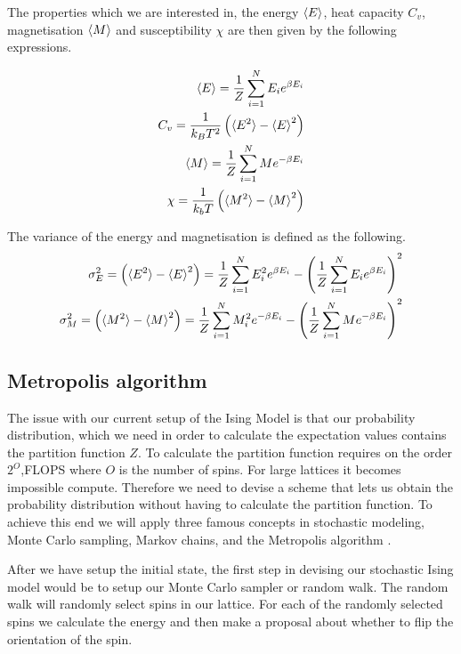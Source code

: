 The properties which we are interested in, the energy $\braket{E}$, heat
capacity $C_v$, magnetisation $\braket{M}$ and susceptibility $\chi$ are then given
by the following expressions.

\begin{eqnarray}
  \braket{E} = \frac{1}{Z} \sum_{i=1}^N E_i e^{\beta E_i} \\
  C_v = \frac{1}{k_B T^2}\left(\braket{E^2} - \braket{E}^2 \right) \\
  \braket{M} = \frac{1}{Z} \sum_{i=1}^{N} M e^{-\beta E_i} \\
  \chi = \frac{1}{k_b T}\left(\braket{M^2}- \braket{M}^2\right)
\end{eqnarray}

The variance of the energy and magnetisation is defined as the following.
\begin{eqnarray}
  \sigma_E^{2} = \left(\braket{E^2} - \braket{E}^2 \right) = \frac{1}{Z}
  \sum_{i=1}^N E_i^2 e^{\beta E_i} - \left(\frac{1}{Z} \sum_{i=1}^N E_i e^{\beta
  E_i}\right)^2  \\
  \sigma_M^{2} = \left(\braket{M^2}- \braket{M}^2\right) = \frac{1}{Z} \sum_{i=1}^{N} M_i^2 e^{-\beta E_i}  - \left(\frac{1}{Z} \sum_{i=1}^{N} M e^{-\beta E_i}  \right)^2
\end{eqnarray}


\subsection{Metropolis algorithm}

The issue with our current setup of the Ising Model is that our probability
distribution, which we need in order to calculate the expectation values
contains the partition function $Z$. To calculate the partition function
requires on the order $2^{O}$,FLOPS where $O$ is the number of spins. For large
lattices it becomes impossible compute. Therefore we need to devise a scheme that lets us
obtain the probability distribution without having to calculate the partition
function. To achieve this end we will apply three famous concepts in stochastic
modeling, Monte Carlo sampling, Markov chains, and the Metropolis algorithm .

After we have setup the initial state, the first step in devising our
stochastic Ising model would be to setup our Monte Carlo sampler or random walk.
The random walk will randomly select spins in
our lattice. For each of the randomly selected spins we calculate the energy and
then make a proposal about whether to flip the orientation of the spin.

